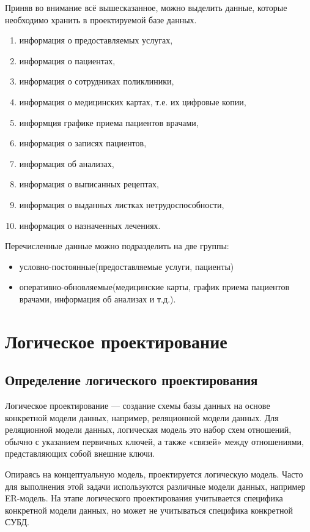 \documentclass[14pt,a4paper,russian]{extreport}
\begin{document}
Приняв во внимание всё вышесказанное, можно выделить данные, которые необходимо хранить в проектируемой базе данных.
\begin{enumerate}[noitemsep]
    \item информация о предоставляемых услугах,
    \item информация о пациентах,
    \item информация о сотрудниках поликлиники,
    \item информация о медицинских картах, т.е. их цифровые копии,
    \item информция графике приема пациентов врачами,
    \item информация о записях пациентов,
    \item информация об анализах,
    \item информация о выписанных рецептах,
    \item информация о выданных листках нетрудоспособности,
    \item информация о назначенных лечениях.
\end{enumerate}

Перечисленные данные можно подразделить на две группы:
\begin{itemize}[noitemsep]
    \item условно-постоянные(предоставляемые услуги, пациенты)
    \item оперативно-обновляемые(медицинские карты, график приема пациентов врачами, информация об
        анализах и т.д.).
\end{itemize}


\chapter{Логическое проектирование}
\section{Определение логического проектирования}
Логическое проектирование — создание схемы базы данных на основе конкретной модели
данных, например, реляционной модели данных. Для реляционной модели данных, логическая модель это
набор схем отношений, обычно с указанием первичных ключей, а также «связей» между
отношениями, представляющих собой внешние ключи.

Опираясь на концептуальную модель, проектируется логическую модель. Часто для выполнения этой
задачи используются различные модели данных, например ER-модель.
На этапе логического проектирования учитывается специфика конкретной модели данных, но может
не учитываться специфика конкретной СУБД. 
\end{document}
